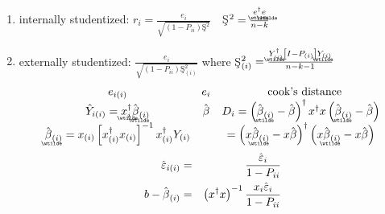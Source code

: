 \documentclass{article}
\begin{document}
\begin{enumerate}
\item internally studentized: $r_{i}=\frac{e_{i}}{\sqrt{\left(
1-P_{ii}\right) \text{\c{S}}^{2}}}\quad $\c{S}$^{2}=\frac{%
\underaccent{\wtilde}{e}%
^{\dagger }%
\underaccent{\wtilde}{e}%
}{n-k}$

\item externally studentized: $\frac{e_{i}}{\sqrt{\left( 1-P_{ii}\right) 
\text{\c{S}}_{\left( i\right) }^{2}}}$\newline
where \c{S}$_{\left( i\right) }^{2}=\frac{%
\underaccent{\wtilde}{Y}%
_{\left( i\right) }^{\dagger }\left[ I-P_{\left( i\right) }\right] 
\underaccent{\wtilde}{Y}%
_{\left( i\right) }}{n-k-1}$%
\begin{equation*}
\begin{array}{ccc}
e_{i\left( i\right) } & e_{i} & \text{cook's distance} \\ 
\hat{Y}_{i\left( i\right) }=%
\underaccent{\wtilde}{x}%
_{i}^{\dagger }%
\underaccent{\wtilde}{\hat{\beta}}%
_{\left( i\right) } & \hat{\beta} & D_{i}=\left( 
\underaccent{\wtilde}{\hat{\beta}}%
_{\left( i\right) }-\hat{\beta}\right) ^{\dagger }x^{\dagger }x\left( 
\underaccent{\wtilde}{\hat{\beta}}%
_{\left( i\right) }-\hat{\beta}\right) \\ 
\underaccent{\wtilde}{\hat{\beta}}%
_{\left( i\right) }=x_{\left( i\right) }\left[ x_{\left( i\right) }^{\dagger
}x_{\left( i\right) }\right] ^{-1}x_{\left( i\right) }^{\dagger }Y_{\left(
i\right) } &  & =\left( x%
\underaccent{\wtilde}{\hat{\beta}}%
_{\left( i\right) }-x\hat{\beta}\right) ^{\dagger }\left( x%
\underaccent{\wtilde}{\hat{\beta}}%
_{\left( i\right) }-x\hat{\beta}\right)%
\end{array}%
\end{equation*}%
\begin{eqnarray*}
\hat{\varepsilon}_{i\left( i\right) } &=&\frac{\hat{\varepsilon}_{i}}{%
1-P_{ii}} \\
b-\hat{\beta}_{\left( i\right) } &=&\left( x^{\dagger }x\right) ^{-1}\frac{%
x_{i}\hat{\varepsilon}_{i}}{1-P_{ii}}
\end{eqnarray*}
\end{enumerate}
\end{document}
